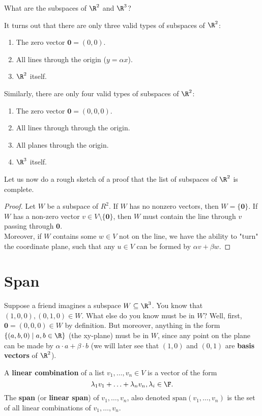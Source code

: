 \documentclass[math0540-lecture-notes.tex]{subfiles}
\begin{document}
\begin{example}
  What are the subspaces of $\R^2$ and $\R^3$?
\end{example}
\begin{solution}
  It turns out that there are only three valid types of subspaces of $ \R^2$:
  \begin{enumerate}
    \item The zero vector $\textbf{0}=(0,0)$.
    \item All lines through the origin ($y=\alpha x$).
    \item $\R^2$ itself.
  \end{enumerate}
  Similarly, there are only four valid types of subspaces of $\R^2$:
  \begin{enumerate}
    \item The zero vector $\textbf{0}=(0,0,0)$.
    \item All lines through through the origin.
    \item All planes through the origin.
    \item $\R^3$ itself.
  \end{enumerate}
\end{solution}
Let us now do a rough sketch of a proof that the list of subspaces of $\R^2$ is complete.
\begin{proof}[Proof]
  Let $W$ be a subspace of $ R^2$. If $W$ has no nonzero vectors, then $W=\{ \textbf{0} \}$. If
  $W$ has a non-zero vector  $v \in V\setminus \{ \textbf{0} \}$, then $W$ must contain the line
  through $v$ passing through  $ \textbf{0}$. \\
  Moreover, if $W$ contains some $w\in V$ not on the line, we have the ability to "turn" the
  coordinate plane, such that any $u\in V$ can be formed by $\alpha v + \beta w$.
\end{proof}


\section{Span}
Suppose a friend imagines a subspace $W\subseteq \R^3$. You know that $(1,0,0),(0,1,0)\in W$. What
else do you know must be in $W$? Well, first, $\textbf{0}=(0,0,0)\in W$ by definition. But moreover,
anything in the form $\{ (a,b,0) \mid a,b\in \R \}$ (the xy-plane) must be in $W$, since any point
on the plane can be made by $ \alpha \cdot a + \beta \cdot b$ (we will later see that $(1,0)$ and
$(0,1)$ are \textbf{basis vectors} of $\R^2$).

\begin{definition}{}
  A \textbf{linear combination}  of a list $ v_1,\ldots,v_n\in V$  is a vector of the form \[
      \lambda_1v_1+\ldots+\lambda_nv_n, \lambda_i\in \F
    .\]  The \textbf{span} (or \textbf{linear span}) of $ v_1,\ldots,v_n$, also denoted
    $\text{span}(v_1,\ldots,v_n)$ is the set of all linear combinations of $ v_1,\ldots,v_n$.
\end{definition}
\end{document}
